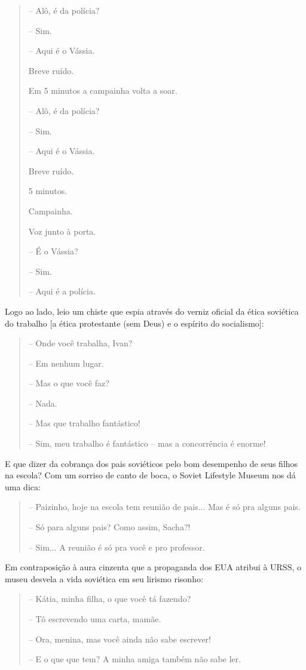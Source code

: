 \begin{quote}
-- Alô, é da polícia?

-- Sim.

-- Aqui é o Vássia.

Breve ruído.

Em 5 minutos a campainha volta a soar.

-- Alô, é da polícia?

-- Sim.

-- Aqui é o Vássia.

Breve ruído.

5 minutos.

Campainha.

Voz junto à porta.

-- É o Vássia?

-- Sim.

-- Aqui é a polícia.
\end{quote}

Logo ao lado, leio um chiste que espia através do verniz oficial da
ética soviética do trabalho {[}a ética protestante (sem Deus) e o
espírito do socialismo{]}:

\begin{quote}
-- Onde você trabalha, Ivan?

-- Em nenhum lugar.

-- Mas o que você faz?

-- Nada.

-- Mas que trabalho fantástico!

-- Sim, meu trabalho é fantástico -- mas a concorrência é enorme!
\end{quote}

E que dizer da cobrança dos pais soviéticos pelo bom desempenho de seus
filhos na escola? Com um sorriso de canto de boca, o Soviet Lifestyle
Museum nos dá uma dica:

\begin{quote}
-- Paizinho, hoje na escola tem reunião de pais... Mas é só pra alguns
pais.

-- Só para alguns pais? Como assim, Sacha?!

-- Sim... A reunião é só pra você e pro professor.
\end{quote}

Em contraposição à aura cinzenta que a propaganda dos EUA atribui à
URSS, o museu desvela a vida soviética em seu lirismo risonho:

\begin{quote}
-- Kátia, minha filha, o que você tá fazendo?

-- Tô escrevendo uma carta, mamãe.

-- Ora, menina, mas você ainda não sabe escrever!

-- E o que que tem? A minha amiga também não sabe ler.
\end{quote}

